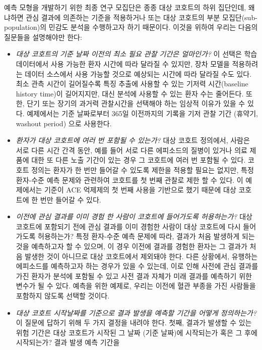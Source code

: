 \documentclass[11pt]{book}
\theoremstyle{definition}
\theoremstyle{definition}
\theoremstyle{definition}
\theoremstyle{remark}
\begin{document}
예측 모형을 개발하기 위한 최종 연구 모집단은 종종 대상 코호트의 하위
집단인데, 왜냐하면 관심 결과에 의존하는 기준을 적용하거나 또는 대상
코호트의 부분 모집단(sub-population)의 민감도 분석을 수행하고자 하기
때문이다. 이것을 위하여 우리는 다음의 질문들을 설명해야만 한다:

\begin{itemize}
\item
  \emph{대상 코호트의 기준 날짜 이전의 최소 필요 관찰 기간은 얼마인가?}
  이 선택은 학습 데이터에서 사용 가능한 환자 시간에 따라 달라질 수
  있지만, 장차 모델을 적용하려는 데이터 소스에서 사용 가능할 것으로
  예상되는 시간에 따라 달라질 수도 있다. 최소 관측 시간이 길어질수록
  특징 추출에 사용할 수 있는 기저력 시간(baseline history time)이
  길어지지만, 대신 분석에 사용할 수 있는 환자 수는 줄어든다. 또한, 단기
  또는 장기의 과거력 관찰시간을 선택해야 하는 임상적 이유가 있을 수
  있다. 예제에서는 기준 날짜로부터 365일 이전까지의 기록을 기저 관찰
  기간 (휴약기, washout period) 으로 사용한다.
\item
  \emph{환자가 대상 코호트에 여러 번 포함될 수 있는가?} 대상 코호트
  정의에서, 사람은 서로 다른 시간 간격 동안, 예를 들어 서로 다른
  에피소드의 질병이 있거나 의료 제품에 대한 또 다른 노출 기간이 있는
  경우 그 코호트에 여러 번 포함될 수 있다. 코호트 정의는 환자가 한 번만
  들어갈 수 있도록 제한을 적용할 필요는 없지만, 특정 환자-수준 예측
  문제와 관련하여 코호트를 첫 번째 관찰로 제한 할 수 있다. 이 예제에서는
  기준이 ACE 억제제의 첫 번째 사용을 기반으로 했기 때문에 대상 코호트에
  한 번만 들어갈 수 있다.
\item
  \emph{이전에 관심 결과를 이미 경험 한 사람이 코호트에 들어가도록
  허용하는가?} 대상 코호트에 포함되기 전에 관심 결과를 이미 경험한
  사람이 대상 코호트에 다시 들어가도록 허용하는가? 특정 환자-수준 예측
  문제에 따라, 결과가 처음 발생하게 되는 것을 예측하고자 할 수 있으며,
  이 경우 이전에 결과를 경험한 환자는 그 결과가 처음 발생한 것이
  아니므로 대상 코호트에서 제외돼야 한다. 다른 상황에서, 유행하는
  에피소드를 예측하고자 하는 경우가 있을 수 있는데, 이로 인해 사전에
  관심 결과를 가진 환자가 분석에 포함될 수 있고 사전 결과 자체가 미래
  결과를 예측하기 위한 변수가 될 수 있다. 예측을 위한 예제로, 우리는
  이전에 혈관 부종을 가진 사람들을 포함하지 않도록 선택할 것이다.
\item
  \emph{대상 코호트 시작날짜를 기준으로 결과 발생을 예측할 기간을 어떻게
  정의하는가?} 이 질문에 답하기 위해 두 가지 결정을 내려야 한다. 첫째,
  결과가 발생할 수 있는 위험 기간은 대상 코호트가 시작된 그 날짜 (기준
  날짜)에 시작되는가 혹은 그 후에 시작되는가? 결과 발생 예측 기간을

\end{itemize}
\end{document}
